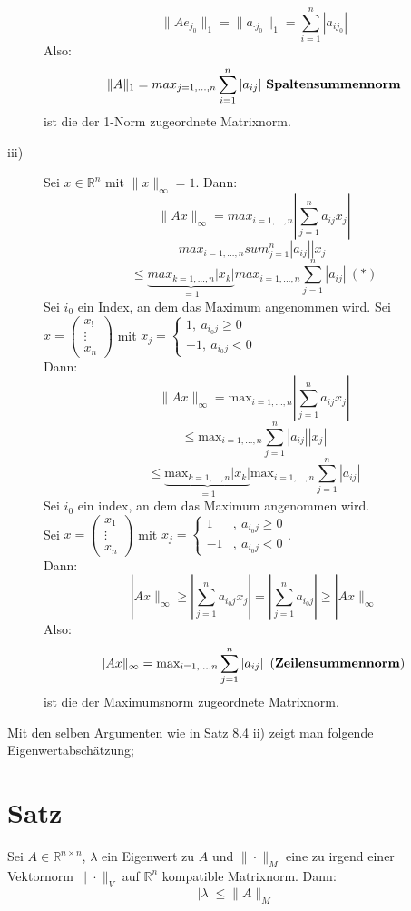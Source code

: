 \documentclass{scrbook}
\begin{document}
\begin{description}
\[
\|Ae_{j_0}\|_1 = \|a_{\cdot j_0}\|_1 = \sum^n_{i=1}|a_{i j_0}|
\]
Also:
\[
\|A\|_1 = max_{j=1,...,n} \sum^n_{i=1}|a_{ij}|\text{ \textbf{Spaltensummennorm}}
\]
ist die der 1-Norm zugeordnete Matrixnorm.
\item[iii)] Sei $x \in \mathbb{R}^n$ mit $\|x\|_\infty =1$. Dann:
\[
\|Ax\|_\infty = max_{i=1,...,n} |\sum^n_{j=1}a_{ij}x_j|
\]
\[max_{i=1,...,n}sum^n_{j=1}|a_{ij}||x_j|\]
\[
\leq \underbrace{max_{k=1,...,n}|x_k|}_{=1} max_{i=1,...,n} \sum^n_{j=1}|a_{ij}| \ (*)
\]
Sei $i_0$ ein Index, an dem das Maximum angenommen wird. Sei $x = \left(
\begin{array}{c}
x_!\\\vdots\\x_n
\end{array}
\right)$ mit $x_j = \left\{
\begin{array}{l}
1,\ a_{i_0j} \geq 0\\
-1,\ a_{i_0j} < 0
\end{array}
\right.$\\
Dann:
\[
\|Ax\|_\infty =\text{max}_{i=1,...,n} \left| \sum^n_{j=1} a_{ij} x_j\right|
\]
\[\leq\text{max}_{i=1,...,n}  \sum^n_{j=1} \left| a_{ij} \right|\left|x_j\right|\]
\[\leq\underbrace{\text{max}_{k=1,...,n} \left|x_k\right|}_{=1} \text{max}_{i=1,...,n} \sum^n_{j=1} \left| a_{ij} \right|\]
Sei $i_0$ ein index, an dem das Maximum angenommen wird.\\
Sei $x = \left(
\begin{array}{c}
x_1\\\vdots\\x_n
\end{array}
\right)$ mit $x_j = \left\{
\begin{array}{ll}
1&,\ a_{i_0j} \geq 0\\
-1&,\ a_{i_0j} < 0
\end{array}
\right.$.\\
Dann:
\[|Ax\|_\infty \geq \left| \sum^n_{j=1}a_{i_0j}x_j\right|=\left| \sum^n_{j=1}a_{i_0j}\right|\geq |Ax\|_\infty\]
Also:
\[|Ax\|_\infty = \text{max}_{i=1,...,n} \sum^n_{j=1} \left| a_{ij} \right| \text{ (\textbf{Zeilensummennorm})}\]
ist die der Maximumsnorm zugeordnete Matrixnorm.
\end{description}
Mit den selben Argumenten wie in Satz 8.4 ii) zeigt man folgende Eigenwertabschätzung;
\section{Satz}
Sei $A\in \mathbb{R}^{n\times n}$, $\lambda$ ein Eigenwert zu $A$ und $\|\cdot\|_M$ eine zu irgend einer Vektornorm $\|\cdot\|_V$ auf $\mathbb{R}^n$ kompatible Matrixnorm. Dann:
\[|\lambda| \leq \|A\|_M\]
\end{document}
